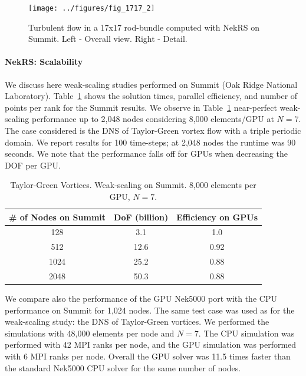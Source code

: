\begin{figure}[h]
\centering
\texttt{[image: ../figures/fig\_1717\_2]}
\caption{Turbulent flow in a 17x17 rod-bundle computed with NekRS on Summit. Left - Overall view. Right - Detail.}
\label{fig:nekrs2}
\end{figure}

\paragraph{NekRS: Scalability}  We discuss here weak-scaling studies performed on Summit (Oak Ridge National Laboratory). Table~\ref{wscaling} shows the solution times, parallel efficiency, and number of points per rank for the Summit results.  We observe in Table~\ref{wscaling} near-perfect weak-scaling performance up to 2,048 nodes considering 8,000 elements/GPU at $N=7$. The case considered is the DNS of Taylor-Green vortex flow with a triple periodic domain. We report results for 100 time-steps; at 2,048 nodes the runtime was 90 seconds. We note that the performance falls off for GPUs when decreasing the DOF per GPU.

\begin{table} [!h]
\begin{center} \begin{tabular}{ccc}
 \hline
\# of Nodes on Summit & DoF (billion) &  Efficiency on GPUs \\
 \hline
 128  & 3.1  & 1.0   \\
 512  & 12.6 & 0.92  \\
 1024 & 25.2 & 0.88  \\
 2048 & 50.3 & 0.88 \\
 \hline
\end{tabular} \end{center}
\caption{\label{wscaling} Taylor-Green Vortices. Weak-scaling on Summit. 8,000 elements per GPU, $N=7$.}
\end{table}

We compare also the performance of the GPU Nek5000 port with the CPU performance on Summit for 1,024 nodes. The same test case was used as for the weak-scaling study: the DNS of Taylor-Green vortices. We performed the simulations with 48,000 elements per node and $N=7$. The CPU simulation was performed with 42 MPI ranks per node, and the GPU simulation was performed with 6 MPI ranks per node. Overall the GPU solver was 11.5 times faster than the standard Nek5000 CPU solver for the same number of nodes.

